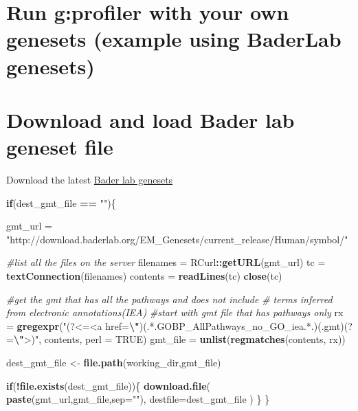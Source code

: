 \documentclass[
]{book}
\newenvironment{Shaded}{\begin{snugshade}}{\end{snugshade}}
\newcommand{\AttributeTok}[1]{\textcolor[rgb]{0.13,0.29,0.53}{#1}}
\newcommand{\CommentTok}[1]{\textcolor[rgb]{0.56,0.35,0.01}{\textit{#1}}}
\newcommand{\ConstantTok}[1]{\textcolor[rgb]{0.56,0.35,0.01}{#1}}
\newcommand{\ControlFlowTok}[1]{\textcolor[rgb]{0.13,0.29,0.53}{\textbf{#1}}}
\newcommand{\FunctionTok}[1]{\textcolor[rgb]{0.13,0.29,0.53}{\textbf{#1}}}
\newcommand{\NormalTok}[1]{#1}
\newcommand{\OtherTok}[1]{\textcolor[rgb]{0.56,0.35,0.01}{#1}}
\newcommand{\SpecialCharTok}[1]{\textcolor[rgb]{0.81,0.36,0.00}{\textbf{#1}}}
\newcommand{\StringTok}[1]{\textcolor[rgb]{0.31,0.60,0.02}{#1}}
\begin{document}
\hypertarget{run-gprofiler-with-your-own-genesets-example-using-baderlab-genesets}{%
\section{Run g:profiler with your own genesets (example using BaderLab genesets)}\label{run-gprofiler-with-your-own-genesets-example-using-baderlab-genesets}}

\hypertarget{download-and-load-bader-lab-geneset-file}{%
\section{Download and load Bader lab geneset file}\label{download-and-load-bader-lab-geneset-file}}

Download the latest \href{https://download.baderlab.org/EM_Genesets/current_release/Human/}{Bader lab genesets}

\begin{Shaded}
\begin{Highlighting}[]
\ControlFlowTok{if}\NormalTok{(dest\_gmt\_file }\SpecialCharTok{==} \StringTok{""}\NormalTok{)\{}

\NormalTok{  gmt\_url }\OtherTok{=} \StringTok{"http://download.baderlab.org/EM\_Genesets/current\_release/Human/symbol/"}

  \CommentTok{\#list all the files on the server}
\NormalTok{  filenames }\OtherTok{=}\NormalTok{ RCurl}\SpecialCharTok{::}\FunctionTok{getURL}\NormalTok{(gmt\_url)}
\NormalTok{  tc }\OtherTok{=} \FunctionTok{textConnection}\NormalTok{(filenames)}
\NormalTok{  contents }\OtherTok{=} \FunctionTok{readLines}\NormalTok{(tc)}
  \FunctionTok{close}\NormalTok{(tc)}
  
  \CommentTok{\#get the gmt that has all the pathways and does not include }
  \CommentTok{\# terms inferred from electronic annotations(IEA)}
  \CommentTok{\#start with gmt file that has pathways only}
\NormalTok{  rx }\OtherTok{=} \FunctionTok{gregexpr}\NormalTok{(}\StringTok{"(?\textless{}=\textless{}a href=}\SpecialCharTok{\textbackslash{}"}\StringTok{)(.*.GOBP\_AllPathways\_no\_GO\_iea.*.)(.gmt)(?=}\SpecialCharTok{\textbackslash{}"}\StringTok{\textgreater{})"}\NormalTok{,}
\NormalTok{    contents, }\AttributeTok{perl =} \ConstantTok{TRUE}\NormalTok{)}
\NormalTok{  gmt\_file }\OtherTok{=} \FunctionTok{unlist}\NormalTok{(}\FunctionTok{regmatches}\NormalTok{(contents, rx))}
  
\NormalTok{  dest\_gmt\_file }\OtherTok{\textless{}{-}} \FunctionTok{file.path}\NormalTok{(working\_dir,gmt\_file)}
  
  \ControlFlowTok{if}\NormalTok{(}\SpecialCharTok{!}\FunctionTok{file.exists}\NormalTok{(dest\_gmt\_file))\{}
    \FunctionTok{download.file}\NormalTok{(}
      \FunctionTok{paste}\NormalTok{(gmt\_url,gmt\_file,}\AttributeTok{sep=}\StringTok{""}\NormalTok{),}
      \AttributeTok{destfile=}\NormalTok{dest\_gmt\_file}
\NormalTok{    )}
\NormalTok{  \}}
\NormalTok{\}}
\end{Highlighting}
\end{Shaded}
\end{document}

